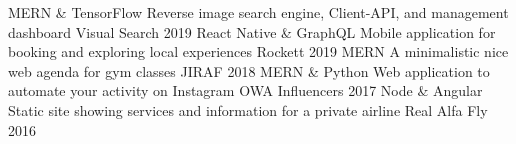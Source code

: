 \begin{cvhonors}
  \cvhonor
    {MERN \& TensorFlow}
    {Reverse image search engine, Client-API, and management dashboard}
    {Visual Search}
    {2019}
  \cvhonor
    {React Native \& GraphQL}
    {Mobile application for booking and exploring local experiences}
    {Rockett}
    {2019}
  \cvhonor
    {MERN}
    {A minimalistic nice web agenda for gym classes}
    {JIRAF}
    {2018}
  \cvhonor
    {MERN \& Python}
    {Web application to automate your activity on Instagram}
    {OWA Influencers}
    {2017}
  \cvhonor
    {Node \& Angular}
    {Static site showing services and information for a private airline}
    {Real Alfa Fly}
    {2016}
\end{cvhonors}
